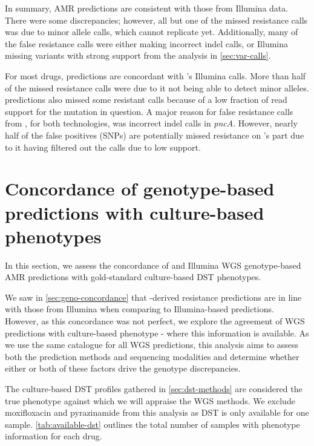 In summary, \mykrobe{} \ont{} AMR predictions are consistent with those from Illumina data. There were some discrepancies; however, all but one of the missed resistance calls was due to minor allele calls, which \ont{} cannot replicate yet. Additionally, many of the false resistance calls were either \ont{} making incorrect indel calls, or Illumina missing variants with strong support from the analysis in \autoref{sec:var-calls}.

For most drugs, \drprg{} predictions are concordant with \mykrobe{}'s Illumina calls. More than half of the \drprg{} missed resistance calls were due to it not being able to detect minor alleles. \drprg{} \ont{} predictions also missed some resistant calls because of a low fraction of read support for the mutation in question. A major reason for false resistance calls from \drprg{}, for both technologies, was incorrect indel calls in \textit{pncA}. However, nearly half of the \drprg{} false positives (SNPs) are potentially missed resistance on \mykrobe{}'s part due to it having filtered out the calls due to low support. 

\section{Concordance of genotype-based predictions with culture-based phenotypes}
\label{sec:pheno-concordance}

In this section, we assess the concordance of \ont{} and Illumina WGS genotype-based AMR predictions with gold-standard culture-based DST phenotypes.

We saw in \autoref{sec:geno-concordance} that \ont{}-derived resistance predictions are in line with those from Illumina when comparing to \mykrobe{} Illumina-based predictions. However, as this concordance was not perfect, we explore the agreement of WGS predictions with culture-based phenotype - where this information is available. As we use the same catalogue for all WGS predictions, this analysis aims to assess both the prediction methods and sequencing modalities and determine whether either or both of these factors drive the genotype discrepancies.

The culture-based DST profiles gathered in \autoref{sec:dst-methods} are considered the true phenotype against which we will appraise the WGS methods. We exclude moxifloxacin and pyrazinamide from this analysis as DST is only available for one sample. \autoref{tab:available-dst} outlines the total number of samples with phenotype information for each drug.

